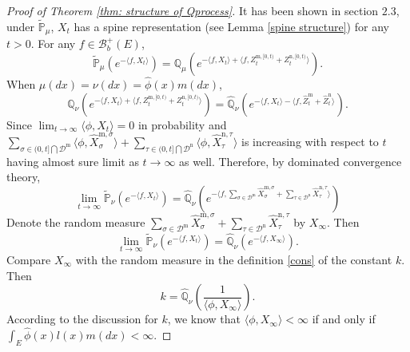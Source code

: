 \documentclass[12pt,a4paper]{amsart}
\theoremstyle{plain}
\theoremstyle{definition}
\numberwithin{equation}{section}
\begin{document}
\begin{proof}[Proof of Theorem \ref{thm: structure of Qprocess}]
It has been shown in section $2.3$, under $\widetilde{\mathbb P}_\mu$,  $X_t$ has a spine representation
(see Lemma \ref{spine structure}) for any $t>0$.  For any $f\in\mathcal B_b^+(E)$,
\[
\widetilde {\mathbb P}_{\mu}\left(e^{-\langle f, X_t\rangle }\right)=\mathbb Q_{\mu}\left(e^{-\langle f, X_t\rangle+\langle f, Z^{{\mathrm m},[0,t)}_t+Z^{{\mathrm n},[0,t)}_t\rangle }\right).
\]
When $\mu(dx)=\nu(dx)=\hat\phi(x)m(dx)$,
\[
\mathbb Q_{\nu}\left(e^{-\langle f, X_t\rangle+\langle f, Z^{{\mathrm m},[0,t)}_t+Z^{{\mathrm n},[0,t)}_t\rangle }\right)=\widehat{\mathbb Q}_{\nu}\left(e^{-\langle f, X_t\rangle-\langle f, \widehat Z^{{\mathrm m}}_t+\widehat Z^{{\mathrm n}}_t\rangle }\right).
\]
Since $\lim_{t\to\infty}\langle\phi, X_{t}\rangle=0$ in probability and $\sum_{\sigma\in(0, t]\bigcap\mathcal D^{\mathrm m}}\langle \phi, \widehat X_{\sigma}^{{\mathrm m},\sigma}\rangle +\sum_{\tau\in (0, t]\bigcap \mathcal D^{\mathrm n}}\langle \phi, \widehat X_{\tau}^{{\mathrm n},\tau}\rangle $ is increasing with respect to $t$ having almost sure limit as $t\to\infty$ as well.  Therefore, by dominated convergence theory,
\[
\lim_{t\to\infty}\widetilde {\mathbb P}_{\nu}\left(e^{-\langle f, X_t\rangle }\right)=\widehat{\mathbb Q}_{\nu}\left(e^{-\langle f,\sum_{\sigma\in\mathcal D^{\mathrm m}}\widehat X^{{\mathrm m},\sigma}_\sigma+\sum_{\tau\in\mathcal D^{\mathrm n}}\widehat X^{{\mathrm n},\tau}_\tau\rangle }\right)
\]
Denote the random measure $\sum_{\sigma\in\mathcal D^{\mathrm m}}\widehat X^{{\mathrm m},\sigma}_\sigma+\sum_{\tau\in\mathcal D^{\mathrm n}}\widehat X^{{\mathrm n},\tau}_\tau$ by $X_\infty$.
Then
\[
\lim_{t\to\infty}\widetilde {\mathbb P}_{\nu}\left(e^{-\langle f, X_t\rangle }\right)=\widehat{\mathbb Q}_\nu \left(e^{-\langle f,X_\infty\rangle}\right).
\]
Compare $X_\infty$ with the random measure in the definition \eqref{cons} of the constant $k$.  Then
$$
k=\widehat{\mathbb Q}_\nu\left(\dfrac{1}{\langle\phi, X_\infty\rangle}\right).
$$
According to the discussion for $k$, we know that $\langle\phi, X_\infty\rangle<\infty$ if and only if $\int_E\hat\phi(x)l(x)m(dx)<\infty$.



\end{proof}
\end{document}
